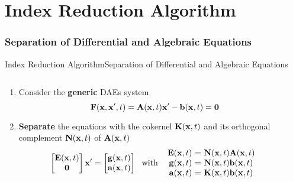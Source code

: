 
\section{Index Reduction Algorithm}

\subsubsection{Separation of Differential and Algebraic Equations}

\begin{frame}{Index Reduction Algorithm}{Separation of Differential and Algebraic Equations}
  \vspace{-1.0em}
  \begin{columns}
    \begin{column}[c]{0.6\textwidth}
      \begin{enumerate}[<+->]
        \item Consider the \textbf{generic} \acsp{DAE} system
        \begin{equation*}
          \mathbf{F}(\mathbf{x}, \mathbf{x}^\prime, t) = \mathbf{A}(\mathbf{x}, t) \mathbf{x}^\prime - \mathbf{b}(\mathbf{x}, t) = \mathbf{0}
        \end{equation*}
        \item \textbf{Separate} the equations with the cokernel $\mathbf{K}(\mathbf{x}, t)$ and its orthogonal complement $\mathbf{N}(\mathbf{x}, t)$ of $\mathbf{A}(\mathbf{x}, t)$
        \begin{equation*}
          \begin{bmatrix} \mE \\ \m{0} \end{bmatrix} \mxp = \begin{bmatrix} \mg \\ \ma \end{bmatrix}
          ~~ \text{with} ~~
          \begin{array}{r@{~}c@{~}l}
            \mE &=& \mN \mA \\
            \mg &=& \mN \mb \\
            \ma &=& \mK \mb
          \end{array}
        \end{equation*}
      \end{enumerate}
      \vspace{-1.0em}
    \end{column}
    \begin{column}[c]{0.4\textwidth}
    \end{column}
  \end{columns}
\end{frame}

